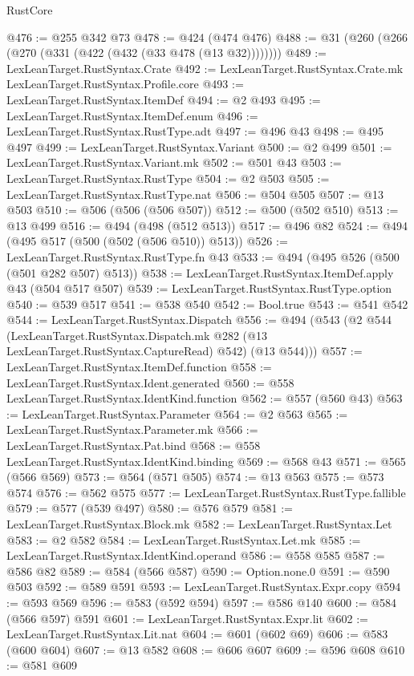 \begin{lexlean}{RustCore}
\begin{coremodule}
@476 := @255 @342 @73
@478 := @424 (@474 @476)
@488 := @31 (@260 (@266 (@270 (@331 (@422 (@432 (@33 @478 (@13 @32))))))))
@489 := LexLeanTarget.RustSyntax.Crate
@492 := LexLeanTarget.RustSyntax.Crate.mk LexLeanTarget.RustSyntax.Profile.core
@493 := LexLeanTarget.RustSyntax.ItemDef
@494 := @2 @493
@495 := LexLeanTarget.RustSyntax.ItemDef.enum
@496 := LexLeanTarget.RustSyntax.RustType.adt
@497 := @496 @43
@498 := @495 @497
@499 := LexLeanTarget.RustSyntax.Variant
@500 := @2 @499
@501 := LexLeanTarget.RustSyntax.Variant.mk
@502 := @501 @43
@503 := LexLeanTarget.RustSyntax.RustType
@504 := @2 @503
@505 := LexLeanTarget.RustSyntax.RustType.nat
@506 := @504 @505
@507 := @13 @503
@510 := @506 (@506 (@506 @507))
@512 := @500 (@502 @510)
@513 := @13 @499
@516 := @494 (@498 (@512 @513))
@517 := @496 @82
@524 := @494 (@495 @517 (@500 (@502 (@506 @510)) @513))
@526 := LexLeanTarget.RustSyntax.RustType.fn @43
@533 := @494 (@495 @526 (@500 (@501 @282 @507) @513))
@538 := LexLeanTarget.RustSyntax.ItemDef.apply @43 (@504 @517 @507)
@539 := LexLeanTarget.RustSyntax.RustType.option
@540 := @539 @517
@541 := @538 @540
@542 := Bool.true
@543 := @541 @542
@544 := LexLeanTarget.RustSyntax.Dispatch
@556 := @494
    (@543
      (@2
        @544
        (LexLeanTarget.RustSyntax.Dispatch.mk @282 (@13 LexLeanTarget.RustSyntax.CaptureRead) @542)
        (@13 @544)))
@557 := LexLeanTarget.RustSyntax.ItemDef.function
@558 := LexLeanTarget.RustSyntax.Ident.generated
@560 := @558 LexLeanTarget.RustSyntax.IdentKind.function
@562 := @557 (@560 @43)
@563 := LexLeanTarget.RustSyntax.Parameter
@564 := @2 @563
@565 := LexLeanTarget.RustSyntax.Parameter.mk
@566 := LexLeanTarget.RustSyntax.Pat.bind
@568 := @558 LexLeanTarget.RustSyntax.IdentKind.binding
@569 := @568 @43
@571 := @565 (@566 @569)
@573 := @564 (@571 @505)
@574 := @13 @563
@575 := @573 @574
@576 := @562 @575
@577 := LexLeanTarget.RustSyntax.RustType.fallible
@579 := @577 (@539 @497)
@580 := @576 @579
@581 := LexLeanTarget.RustSyntax.Block.mk
@582 := LexLeanTarget.RustSyntax.Let
@583 := @2 @582
@584 := LexLeanTarget.RustSyntax.Let.mk
@585 := LexLeanTarget.RustSyntax.IdentKind.operand
@586 := @558 @585
@587 := @586 @82
@589 := @584 (@566 @587)
@590 := Option.none.{0}
@591 := @590 @503
@592 := @589 @591
@593 := LexLeanTarget.RustSyntax.Expr.copy
@594 := @593 @569
@596 := @583 (@592 @594)
@597 := @586 @140
@600 := @584 (@566 @597) @591
@601 := LexLeanTarget.RustSyntax.Expr.lit
@602 := LexLeanTarget.RustSyntax.Lit.nat
@604 := @601 (@602 @69)
@606 := @583 (@600 @604)
@607 := @13 @582
@608 := @606 @607
@609 := @596 @608
@610 := @581 @609

\end{coremodule}
\end{lexlean}
